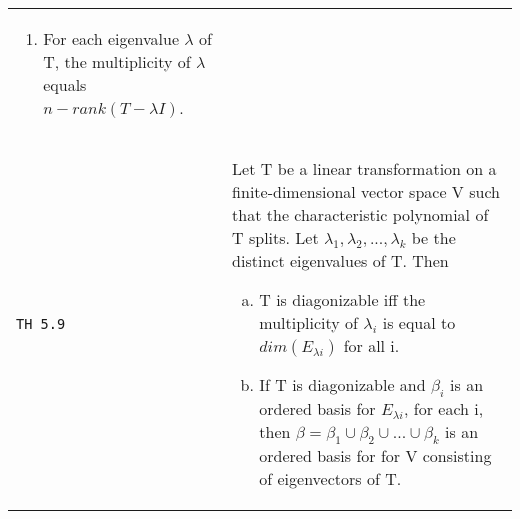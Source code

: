 \documentclass[10pt,landscape]{article}
\begin{document}
\begin{multicols}{3}
\begin{tabular}{@{}p{\the\MyLen}%
                @{}p{\linewidth-\the\MyLen}@{}}
\begin{enumerate}
               \item For each eigenvalue $\lambda$ of T, the multiplicity of $\lambda$ equals $n - rank(T - \lambda I)$.
             \end{enumerate}\\
\verb!TH 5.9! & Let T be a linear transformation on a finite-dimensional vector space V such that the characteristic polynomial of T splits. Let $\lambda_1 , \lambda_2 ,...,\lambda_k$ be
               the distinct eigenvalues of T. Then
               \begin{enumerate}[a)]
                 \item T is diagonizable iff the multiplicity of $\lambda_i$ is equal to $dim(E_{\lambda i})$ for all i.
                 \item If T is diagonizable and $\beta_i$ is an ordered basis for $E_{\lambda i}$, for each i, then $\beta = \beta_1\cup\beta_2\cup ...\cup\beta_k$ is an ordered basis for
                       for V consisting of eigenvectors of T.
               \end{enumerate}
\end{tabular}

\end{multicols}
\end{document}
